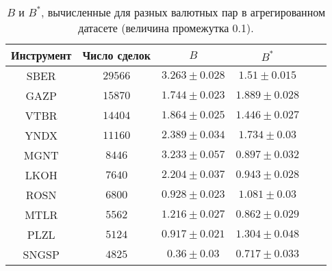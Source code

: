 \begin{table}[h!]
    \begin{center}
        \begin{tabular}{|c|c|c|c|c|c|}
            \hline
            Инструмент & Число сделок & $B$               & $B ^*$            \\ \hline
            SBER & $29566$ & $3.263 \pm 0.028$ & $1.51 \pm 0.015$ \\ \hline
            GAZP       & $15870$      & $1.744 \pm 0.023$ & $1.889 \pm 0.028$ \\ \hline
            VTBR       & $14404$      & $1.864 \pm 0.025$ & $1.446 \pm 0.027$ \\ \hline
            YNDX       & $11160$      & $2.389 \pm 0.034$ & $1.734 \pm 0.03$  \\ \hline
            MGNT       & $8446$       & $3.233 \pm 0.057$ & $0.897 \pm 0.032$ \\ \hline
            LKOH       & $7640$       & $2.204 \pm 0.037$ & $0.943 \pm 0.028$ \\ \hline
            ROSN       & $6800$       & $0.928 \pm 0.023$ & $1.081 \pm 0.03$  \\ \hline
            MTLR       & $5562$       & $1.216 \pm 0.027$ & $0.862 \pm 0.029$ \\ \hline
            PLZL       & $5124$       & $0.917 \pm 0.021$ & $1.304 \pm 0.048$ \\ \hline
            SNGSP      & $4825$       & $0.36 \pm 0.03$   & $0.717 \pm 0.033$ \\ \hline
        \end{tabular}
    \end{center}\caption{$B$ и $B ^*$, вычисленные для разных валютных пар в агрегированном датасете (величина промежутка 0.1).}
    \label{Aggreg1CU0.1} \end{table}


